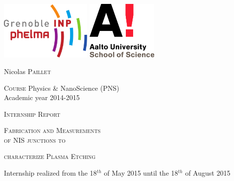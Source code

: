 \begin{titlepage}

    \begin{center}
    
        \includegraphics[width=45mm]{logo_phelma.png}
        \hfill
        \includegraphics[width=35mm]{logo_aalto.png}
        \vspace{2cm}
        
        {\LARGE Nicolas \textsc{Paillet}}\\
        \vspace{0.5cm}
        
        \textsc{Course} Physics \& NanoScience (PNS)\\
        Academic year 2014-2015\\
        \vspace{1.5cm}
        
        {\LARGE \textsc{Internship Report}}
        \vspace{0.4cm}
        
        {\Huge \textsc{Fabrication and Measurements}\\        
        \textsc{of NIS junctions to}
        \vspace{0.3cm}
        
        \textsc{characterize Plasma Etching}}     
        
        \vspace{2cm}
        
        Internship realized from the 18$^{th}$ of May 2015 until the 18$^{th}$ of August 2015\\
        
    \vspace{0.3cm}
    

\end{center}
\end{titlepage}
